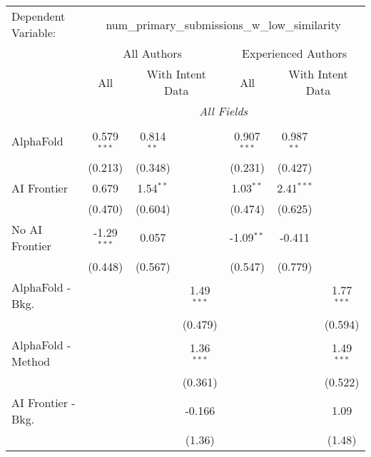 \begingroup
\centering
\begin{tabular}{lcccccc}
   \tabularnewline \midrule \midrule
   Dependent Variable: & \multicolumn{6}{c}{num\_primary\_submissions\_w\_low\_similarity}\\
 & \multicolumn{3}{c}{All Authors} & \multicolumn{3}{c}{Experienced Authors} \\
\cmidrule(lr){2-4} \cmidrule(lr){5-7}
 & \multicolumn{1}{c}{All} & \multicolumn{2}{c}{With Intent Data} & \multicolumn{1}{c}{All} & \multicolumn{2}{c}{With Intent Data} \\
\cmidrule(lr){2-2} \cmidrule(lr){3-4} \cmidrule(lr){5-5} \cmidrule(lr){6-7}
 & \multicolumn{6}{c}{\textit{All Fields}} \\ \\
   AlphaFold               & 0.579$^{***}$ & 0.814$^{**}$ &              & 0.907$^{***}$ & 0.987$^{**}$ &   \\   
                           & (0.213)       & (0.348)      &              & (0.231)       & (0.427)      &   \\   
   AI Frontier             & 0.679         & 1.54$^{**}$  &              & 1.03$^{**}$   & 2.41$^{***}$ &   \\   
                           & (0.470)       & (0.604)      &              & (0.474)       & (0.625)      &   \\   
   No AI Frontier          & -1.29$^{***}$ & 0.057        &              & -1.09$^{**}$  & -0.411       &   \\   
                           & (0.448)       & (0.567)      &              & (0.547)       & (0.779)      &   \\   
   AlphaFold - Bkg.        &               &              & 1.49$^{***}$ &               &              & 1.77$^{***}$\\   
                           &               &              & (0.479)      &               &              & (0.594)\\   
   AlphaFold - Method      &               &              & 1.36$^{***}$ &               &              & 1.49$^{***}$\\   
                           &               &              & (0.361)      &               &              & (0.522)\\   
   AI Frontier - Bkg.      &               &              & -0.166       &               &              & 1.09\\   
                           &               &              & (1.36)       &               &              & (1.48)\\   

\end{tabular}
